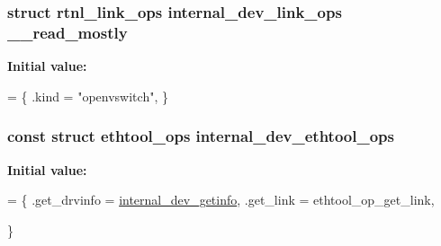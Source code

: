 \subsubsection[{\+\_\+\+\_\+read\+\_\+mostly}]{\setlength{\rightskip}{0pt plus 5cm}struct rtnl\+\_\+link\+\_\+ops internal\+\_\+dev\+\_\+link\+\_\+ops \+\_\+\+\_\+read\+\_\+mostly\hspace{0.3cm}{\ttfamily [static]}}\label{vport-internal__dev_8c_a8e42f895d19142ac43bdcfedf9271120}
{\bfseries Initial value\+:}
\begin{DoxyCode}
= \{
    .kind = \textcolor{stringliteral}{"openvswitch"},
\}
\end{DoxyCode}
\hypertarget{vport-internal__dev_8c_aa2c816d0e5a964778079cefc6d9f2c13}{}
\subsubsection[{internal\+\_\+dev\+\_\+ethtool\+\_\+ops}]{\setlength{\rightskip}{0pt plus 5cm}const struct ethtool\+\_\+ops internal\+\_\+dev\+\_\+ethtool\+\_\+ops\hspace{0.3cm}{\ttfamily [static]}}\label{vport-internal__dev_8c_aa2c816d0e5a964778079cefc6d9f2c13}
{\bfseries Initial value\+:}
\begin{DoxyCode}
= \{
    .get\_drvinfo    = \hyperlink{vport-internal__dev_8c_a2b613f99606cc15239007e60575ee5f5}{internal\_dev\_getinfo},
    .get\_link   = ethtool\_op\_get\_link,








\}
\end{DoxyCode}
\hypertarget{vport-internal__dev_8c_af6e4b8260f029c8e987281b6e9890b8e}{}
